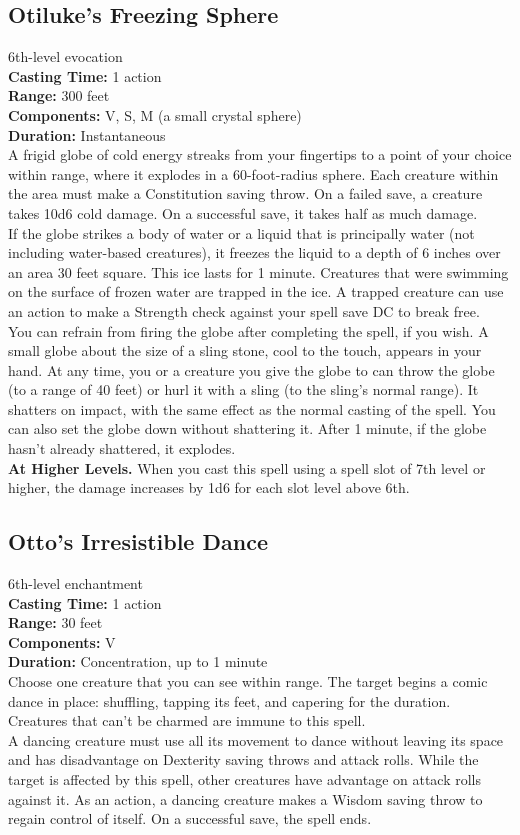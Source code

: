 \documentclass[11pt, A4paper, english]{article}
\begin{document}
		\subsection{Otiluke's Freezing Sphere}
6th-level evocation \\
\textbf{Casting Time:} 1 action \\
\textbf{Range:} 300 feet \\
\textbf{Components:} V, S, M (a small crystal sphere) \\
\textbf{Duration:} Instantaneous \\
A frigid globe of cold energy streaks from your fingertips to a point of your choice within range, where it explodes in a 60-foot-radius sphere. Each creature within the area must make a Constitution saving throw. On a failed save, a creature takes 10d6 cold damage. On a successful save, it takes half as much damage. \\
If the globe strikes a body of water or a liquid that is principally water (not including water-based creatures), it freezes the liquid to a depth of 6 inches over an area 30 feet square. This ice lasts for 1 minute. Creatures that were swimming on the surface of frozen water are trapped in the ice. A trapped creature can use an action to make a Strength check against your spell save DC to break free. \\
You can refrain from firing the globe after completing the spell, if you wish. A small globe about the size of a sling stone, cool to the touch, appears in your hand. At any time, you or a creature you give the globe to can throw the globe (to a range of 40 feet) or hurl it with a sling (to the sling’s normal range). It shatters on impact, with the same effect as the normal casting of the spell. You can also set the globe down without shattering it. After 1 minute, if the globe hasn’t already shattered, it explodes. \\
\textbf{At Higher Levels.} When you cast this spell using a spell slot of 7th level or higher, the damage increases by 1d6 for each slot level above 6th.

		\subsection{Otto's Irresistible Dance}
6th-level enchantment \\
\textbf{Casting Time:} 1 action \\
\textbf{Range:} 30 feet \\
\textbf{Components:} V \\
\textbf{Duration:} Concentration, up to 1 minute \\
Choose one creature that you can see within range. The target begins a comic dance in place: shuffling, tapping its feet, and capering for the duration. Creatures that can’t be charmed are immune to this spell. \\
A dancing creature must use all its movement to dance without leaving its space and has disadvantage on Dexterity saving throws and attack rolls. While the target is affected by this spell, other creatures have advantage on attack rolls against it. As an action, a dancing creature makes a Wisdom  saving throw to regain control of itself. On a successful save, the spell ends.
\end{document}
